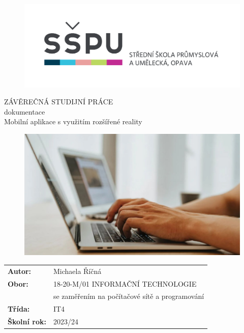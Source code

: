 \documentclass[12pt, a4paper,
twoside,        %
openright
]{report}
\title{\nazevPrace} %
\author{\jmenoAutora} %
\date{\datumOdevzdani} %
\newcommand\obor{INFORMAČNÍ TECHNOLOGIE} %
\newcommand\kodOboru{18-20-M/01} %
\newcommand\zamereni{se zaměřením na počítačové sítě a programování} %
\newcommand\trida{IT4} %
\newcommand\jmenoAutora{Michaela Říčná}  %
\newcommand\skolniRok{2023/24} %
\newcommand\nazevPrace{Mobilní aplikace s využitím rozšířené reality} %
\begin{document}
	
	\pagestyle{empty}
	
	\cleardoublepage

	
	{\selectfont
		\begin{figure}[h]
			\centering
			\includegraphics[width=0.6\linewidth]{image/logo-skoly.png} 
		\end{figure}
		
		
		{\bfseries %
			\begin{center}
				\vspace{0.025 \textheight}
				\LARGE{ZÁVĚREČNÁ STUDIJNÍ PRÁCE}\\
				\large{dokumentace}\\
				\vspace{0.075 \textheight}
				\LARGE {\nazevPrace}\\
			\end{center}  
		}%
		
		\begin{figure}[h]
			\centering
			\includegraphics[width=0.8\linewidth]{image/programovani-02.jpg} 
		\end{figure}
		
		\vspace{0.02 \textheight}
		\begin{table}[h!]
			\begin{tabular}{ll}
				\textbf{Autor:} & \jmenoAutora\\ 
				\textbf{Obor:} & \kodOboru { } \obor\\
				\textbf{} & \zamereni\\
				\textbf{Třída:} & \trida\\
				\textbf{Školní rok:} & \skolniRok\\
			\end{tabular}
			
		\end{table}		
	}
	
\end{document}
